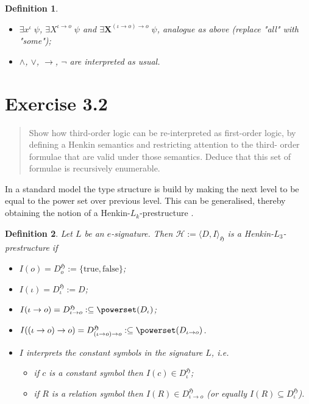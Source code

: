 \documentclass[11pt,a4paper]{article}
\newtheorem{mydef}{Definition}
\newcommand{\of}{\iota }
\newcommand{\os}{\iota \to o}
\newcommand{\ot}{(\iota \to o)\to o}
\begin{document}
\begin{mydef}
\begin{itemize}
\item $\exists x^{\of} \; \psi$, $\exists X^{\os} \; \psi$ and $ \exists \mathbf{X}^{\ot} \; \psi$, analogue as above (replace "all" with "some");
\item $\land$, $\lor$, $\to$, $\neg$ are interpreted as usual.
\end{itemize}
\end{mydef} 


\section*{Exercise 3.2}
\begin{quote}
Show how third-order logic can be re-interpreted as first-order logic, by defining a Henkin semantics and restricting attention to the third- order formulae that are valid under those semantics. Deduce that this set of formulae is recursively enumerable.
\end{quote}

In a standard model the type structure is build by making the next level to be equal to the power set over previous level. This can be generalised, thereby obtaining the notion of a Henkin-$L_k$-prestructure .

\begin{mydef}
Let $L$ be an $e$-signature. Then $\mathcal{H}:=\langle D, I \rangle_{\mathfrak{H}}$ is a Henkin-$L_3$-prestructure  if
\begin{itemize}
\item $I(o)=D_o^{\mathfrak{H}}:=\{\mathrm{true}, \mathrm{false}\}$;
\item $I(\of)=D_{\of}^{\mathfrak{H}}:=D$;
\item $I(\os)=D_{\os}^{\mathfrak{H}}:\subseteq \powerset(D_{\of})$;
\item $I(\ot)= D_{\ot}^{\mathfrak{H}}:\subseteq \powerset(D_{\os})$.
\item $I$ interprets the constant symbols in the signature $L$, i.e.
\begin{itemize}
\item if $c$ is a constant symbol then $I(c) \in D_{\of}^{\mathfrak{H}}$;
\item if $R$ is a relation symbol then $I(R) \in D_{\os}^{\mathfrak{H}}$ (or equally $I(R) \subseteq D_{\of}^{\mathfrak{H}}$).
\end{itemize}
\end{itemize}
\end{mydef}
\end{document}

